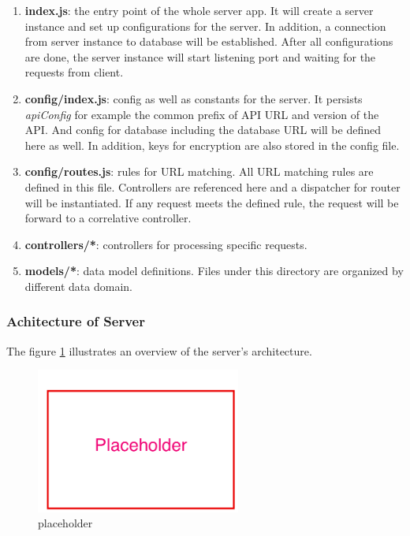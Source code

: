 \begin{enumerate}
\item 
  \textbf{index.js}: the entry point of the whole server app. It will create a server instance and set up configurations for the server. In addition, a connection from server instance to database will be established. After all configurations are done, the server instance will start listening port and waiting for the requests from client.
\item
  \textbf{config/index.js}: config as well as constants for the server. It persists \textit{apiConfig} for example the common prefix of API URL and version of the API. And config for database including the database URL will be defined here as well. In addition, keys for encryption are also stored in the config file.
\item
  \textbf{config/routes.js}: rules for URL matching. All URL matching rules are defined in this file. Controllers are referenced here and a dispatcher for router will be instantiated. If any request meets the defined rule, the request will be forward to a correlative controller. 
\item
  \textbf{controllers/*}: controllers for processing specific requests.
\item 
  \textbf{models/*}: data model definitions. Files under this directory are organized by different data domain.
\end{enumerate}


\subsubsection{Achitecture of Server}

The figure \ref{fig:server-arch-imp} illustrates an overview of the server's architecture. 

\begin{figure}[!htbp]
  \centering
    \includegraphics[width=0.6\textwidth]{Figures/placeholder.png}
  \caption{placeholder}
  \label{fig:server-arch-imp}
\end{figure}




